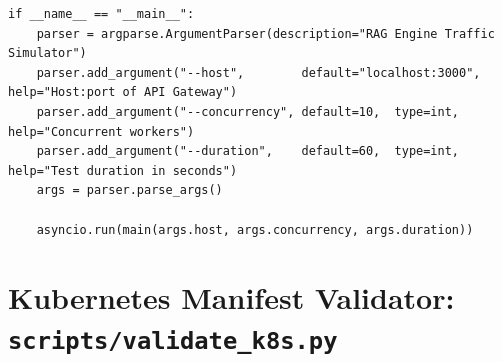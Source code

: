 \documentclass[12pt,a4paper]{report}
\begin{document}
\begin{lstlisting}
if __name__ == "__main__":
    parser = argparse.ArgumentParser(description="RAG Engine Traffic Simulator")
    parser.add_argument("--host",        default="localhost:3000", help="Host:port of API Gateway")
    parser.add_argument("--concurrency", default=10,  type=int,   help="Concurrent workers")
    parser.add_argument("--duration",    default=60,  type=int,   help="Test duration in seconds")
    args = parser.parse_args()

    asyncio.run(main(args.host, args.concurrency, args.duration))
\end{lstlisting}

\section{Kubernetes Manifest Validator: \texttt{scripts/validate\_k8s.py}}
\end{document}
